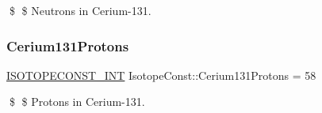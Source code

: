 \$ \$ Neutrons in Cerium-\/131. \mbox{\label{group___isotope_const-_cerium-_ce131_ga6618eae96984c14dd11b2686a8032e3c}} 
\subsubsection{\texorpdfstring{Cerium131\+Protons}{Cerium131Protons}}
{\footnotesize\ttfamily \mbox{\hyperlink{group___isotope_const-_macros_ga5f18360b3e99483a35c32d789e62621c}{I\+S\+O\+T\+O\+P\+E\+C\+O\+N\+S\+T\+\_\+\+I\+NT}} Isotope\+Const\+::\+Cerium131\+Protons = 58}

\$ \$ Protons in Cerium-\/131. 